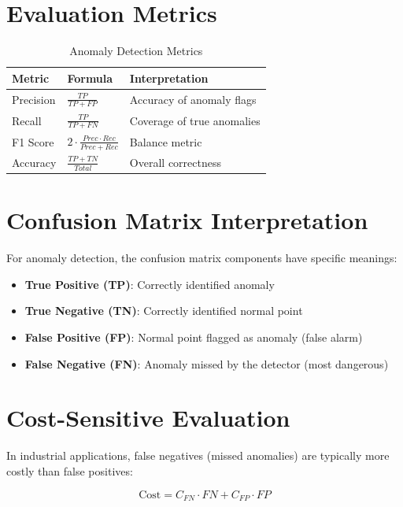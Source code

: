 \documentclass[12pt,a4paper]{report}
\begin{document}
\section{Evaluation Metrics}

\begin{table}[H]
\centering
\caption{Anomaly Detection Metrics}
\begin{tabular}{lll}
\toprule
\textbf{Metric} & \textbf{Formula} & \textbf{Interpretation} \\
\midrule
Precision & $\frac{TP}{TP+FP}$ & Accuracy of anomaly flags \\
Recall & $\frac{TP}{TP+FN}$ & Coverage of true anomalies \\
F1 Score & $2\cdot\frac{Prec \cdot Rec}{Prec+Rec}$ & Balance metric \\
Accuracy & $\frac{TP+TN}{Total}$ & Overall correctness \\
\bottomrule
\end{tabular}
\end{table}

\section{Confusion Matrix Interpretation}

For anomaly detection, the confusion matrix components have specific meanings:
\begin{itemize}
    \item \textbf{True Positive (TP)}: Correctly identified anomaly
    \item \textbf{True Negative (TN)}: Correctly identified normal point
    \item \textbf{False Positive (FP)}: Normal point flagged as anomaly (false alarm)
    \item \textbf{False Negative (FN)}: Anomaly missed by the detector (most dangerous)
\end{itemize}

\section{Cost-Sensitive Evaluation}

In industrial applications, false negatives (missed anomalies) are typically more costly than false positives:

\begin{equation}
\text{Cost} = C_{FN} \cdot FN + C_{FP} \cdot FP
\end{equation}
\end{document}
